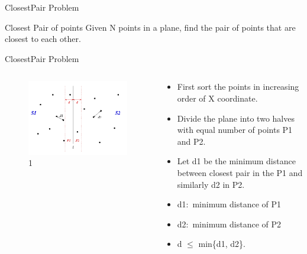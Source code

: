 \documentclass{beamer}
\begin{document}
\begin{frame}{ClosestPair Problem}
  \begin{block}{Closest Pair of points}
    Given N points in a plane, find the pair of points that are closest to each other.
  \end{block}
\end{frame}

\begin{frame}[<+->]{ClosestPair Problem}
  \begin{columns}[t]
    \begin{column}{0.5\textwidth}
      \vspace{10mm}
      \begin{figure}
	\includegraphics[scale=0.30]{figure21.png}
	\caption{1}
      \end{figure}
    \end{column}
    \begin{column}{0.5\textwidth}
      \begin{itemize}
	\item First sort the points in increasing order of X coordinate.
	\item Divide the plane into two halves with equal number of points P1 and P2.
	\item Let d1 be the minimum distance between closest pair in the P1 and similarly d2 in P2.
	\item d1$:$ minimum distance of P1
	\item d2$:$ minimum distance of P2
	\item d $\leq$ min\{d1, d2\}.
      \end{itemize}
    \end{column}
  \end{columns}
\end{frame}
\end{document}
